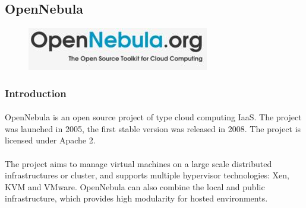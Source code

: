 % 
\newpage
\subsection{OpenNebula}

\begin{figure}[!h]
 \center
 \includegraphics{./images/OpenNebula-Logo.jpg}
\end{figure}

\subsubsection{Introduction}

\paragraph{} OpenNebula is an open source project of type cloud computing IaaS. The project was launched in 2005, the first stable version was released in 2008. 
The project is licensed under Apache 2.
\paragraph{} The project aims to manage virtual machines on a large scale distributed infrastructures or cluster, and supports multiple hypervisor technologies: Xen, KVM and VMware.
OpenNebula can also combine the local and public infrastructure, which provides high modularity for hosted environments.

